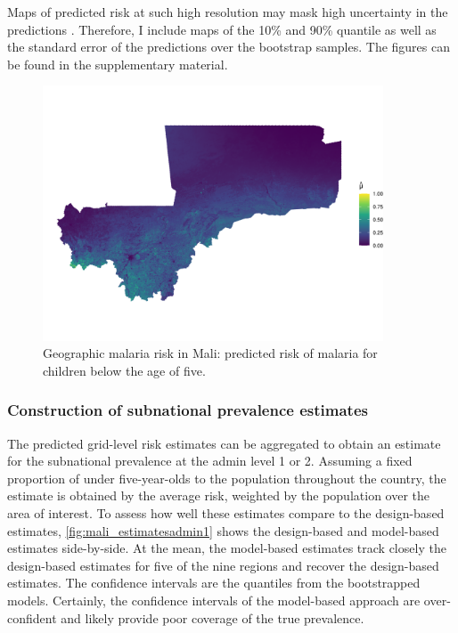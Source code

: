 Maps of predicted risk at such high resolution may mask high uncertainty in the predictions \autocite{dongModelingPresentationVaccination2021}. Therefore, I include maps of the 10\% and 90\% quantile as well as the standard error of the predictions over the bootstrap samples. The figures can be found in the supplementary material.

\begin{figure}[!t]
	\centering
	\includegraphics[width=0.9\textwidth, keepaspectratio]{figures/mali_predictions.png}
	\caption{Geographic malaria risk in Mali: predicted risk of malaria for children below the age of five. }
	\label{fig:mali_predictions}
\end{figure}


\subsubsection*{Construction of subnational prevalence estimates}

The predicted grid-level risk estimates can be aggregated to obtain an estimate for the subnational prevalence at the admin level 1 or 2. Assuming a fixed proportion of under five-year-olds to the population throughout the country, the estimate is obtained by the average risk, weighted by the population over the area of interest. To assess how well these estimates compare to the design-based estimates, \autoref{fig:mali_estimatesadmin1} shows the design-based and model-based estimates side-by-side. At the mean, the model-based estimates track closely the design-based estimates for five of the nine regions and recover the design-based estimates. The confidence intervals are the quantiles from the bootstrapped models. Certainly, the confidence intervals of the model-based approach are over-confident and likely provide poor coverage of the true prevalence.

